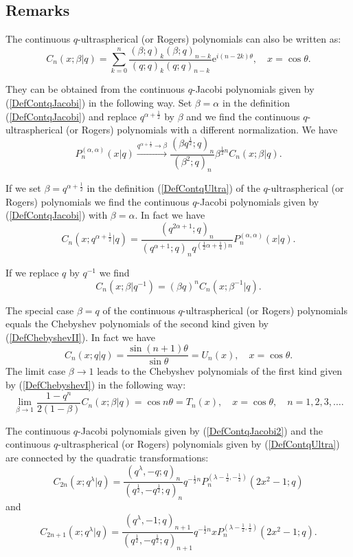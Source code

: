 \documentclass[envcountchap,graybox]{svmono}
\newcounter{rom}
\newcommand{\e}{\textrm{e}}
\begin{document}
\subsection*{Remarks} 
The continuous $q$-ultraspherical (or Rogers) polynomials
can also be written as:
$$C_n(x;\beta|q)=\sum_{k=0}^n\frac{(\beta;q)_k(\beta;q)_{n-k}}{(q;q)_k(q;q)_{n-k}}
\e^{i(n-2k)\theta},\quad x=\cos\theta.$$

\noindent
They can be obtained from the continuous $q$-Jacobi polynomials given by
(\ref{DefContqJacobi}) in the following way. Set $\beta=\alpha$ in the definition
(\ref{DefContqJacobi}) and replace $q^{\alpha+\frac{1}{2}}$ by $\beta$ and we find
the continuous $q$-ultraspherical (or Rogers) polynomials with a different
normalization. We have
$$P_n^{(\alpha,\alpha)}(x|q)\stackrel{q^{\alpha+\frac{1}{2}}\rightarrow\beta}{\longrightarrow}
\frac{(\beta q^{\frac{1}{2}};q)_n}{(\beta^2;q)_n}\beta^{\frac{1}{2}n}C_n(x;\beta|q).$$

\noindent
If we set $\beta=q^{\alpha+\frac{1}{2}}$ in the definition (\ref{DefContqUltra}) of
the $q$-ultraspherical (or Rogers) polynomials we find the continuous
$q$-Jacobi polynomials given by (\ref{DefContqJacobi}) with $\beta=\alpha$. In fact we have
$$C_n(x;q^{\alpha+\frac{1}{2}}|q)=
\frac{(q^{2\alpha+1};q)_n}{(q^{\alpha+1};q)_nq^{(\frac{1}{2}\alpha+\frac{1}{4})n}}P_n^{(\alpha,\alpha)}(x|q).$$

\noindent
If we replace $q$ by $q^{-1}$ we find
$$C_n(x;\beta|q^{-1})=(\beta q)^nC_n(x;\beta^{-1}|q).$$

\noindent
The special case $\beta=q$ of the continuous $q$-ultraspherical (or Rogers)
polynomials equals the Chebyshev polynomials of the second kind given by
(\ref{DefChebyshevII}). In fact we have
$$C_n(x;q|q)=\frac{\sin(n+1)\theta}{\sin\theta}=U_n(x),\quad x=\cos\theta.$$
The limit case $\beta\rightarrow 1$ leads to the Chebyshev polynomials of the
first kind given by (\ref{DefChebyshevI}) in the following way:
$$\lim_{\beta\rightarrow 1}\frac{1-q^n}{2(1-\beta)}C_n(x;\beta|q)=\cos n\theta
=T_n(x),\quad x=\cos\theta,\quad n=1,2,3,\ldots.$$

\noindent
The continuous $q$-Jacobi polynomials given by (\ref{DefContqJacobi2}) and
the continuous $q$-ultraspherical (or Rogers) polynomials given by
(\ref{DefContqUltra}) are connected by the quadratic transformations:
$$C_{2n}(x;q^{\lambda}|q)=\frac{(q^{\lambda},-q;q)_n}
{(q^{\frac{1}{2}},-q^{\frac{1}{2}};q)_n}q^{-\frac{1}{2}n}
P_n^{(\lambda-\frac{1}{2},-\frac{1}{2})}(2x^2-1;q)$$
and
$$C_{2n+1}(x;q^{\lambda}|q)=\frac{(q^{\lambda},-1;q)_{n+1}}
{(q^{\frac{1}{2}},-q^{\frac{1}{2}};q)_{n+1}}q^{-\frac{1}{2}n}
xP_n^{(\lambda-\frac{1}{2},\frac{1}{2})}(2x^2-1;q).$$
\end{document}
